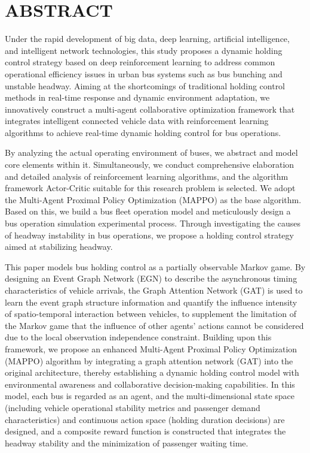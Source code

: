 \chapter*{\textbf{ABSTRACT}}
\eabstractpagestyle %
Under the rapid development of big data, deep learning, artificial intelligence, 
and intelligent network technologies, this study proposes a dynamic holding control 
strategy based on deep reinforcement learning to address common operational efficiency 
issues in urban bus systems such as bus bunching and unstable headway. Aiming at the
shortcomings of traditional holding control methods in real-time response and dynamic 
environment adaptation, we innovatively construct a multi-agent collaborative optimization 
framework that integrates intelligent connected vehicle data with reinforcement learning algorithms 
to achieve real-time dynamic holding control for bus operations.

By analyzing the actual operating environment of buses, we abstract and model core elements within it. 
Simultaneously, we conduct comprehensive elaboration and detailed analysis of reinforcement learning 
algorithms, and the algorithm framework Actor-Critic suitable for this research problem is selected. 
We adopt the Multi-Agent Proximal Policy Optimization (MAPPO) as the base algorithm. 
Based on this, we build a bus fleet operation model and meticulously design a bus operation simulation 
experimental process. Through investigating the causes of headway instability in bus operations, 
we propose a holding control strategy aimed at stabilizing headway.

This paper models bus holding control as a partially observable Markov game.
By designing an Event Graph Network (EGN) to describe the asynchronous timing characteristics 
of vehicle arrivals, the Graph Attention Network (GAT) is used to learn the event graph 
structure information and quantify the influence intensity of spatio-temporal interaction 
between vehicles, to supplement the limitation of the Markov game that the influence of 
other agents' actions cannot be considered due to the local observation independence constraint.
Building upon this framework, we propose an enhanced Multi-Agent Proximal Policy Optimization (MAPPO) 
algorithm by integrating a graph attention network (GAT) into the original architecture, 
thereby establishing a dynamic holding control model with environmental awareness and collaborative 
decision-making capabilities.
In this model, each bus is regarded as an agent, and the multi-dimensional state space 
(including vehicle operational stability metrics and passenger demand characteristics)
and continuous action space (holding duration decisions) are designed, and a composite reward function is 
constructed that integrates the headway stability and the minimization of passenger waiting time.

